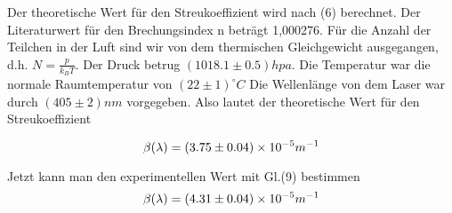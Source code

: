 Der theoretische Wert für den Streukoeffizient wird nach (6) berechnet. Der Literaturwert für den Brechungsindex n beträgt 1,000276. Für die Anzahl der Teilchen in der Luft sind wir von dem thermischen Gleichgewicht ausgegangen, d.h. $N = \frac{p}{k_B T}$. Der Druck betrug $(1018.1 \pm 0.5)hpa$. Die Temperatur war die normale Raumtemperatur von $(22 \pm 1)^{\circ}C$ Die Wellenlänge von dem Laser war durch $(405 \pm 2)nm$ vorgegeben. Also lautet der theoretische Wert für den Streukoeffizient

\begin{equation}
\notag
\beta(\lambda)= (3.75 \pm 0.04) \times 10^{-5} m^{-1}
\end{equation}

Jetzt kann man den experimentellen Wert mit Gl.(9) bestimmen
\begin{equation}
\notag
\beta(\lambda)= (4.31 \pm 0.04) \times 10^{-5} m^{-1}
\end{equation} 




